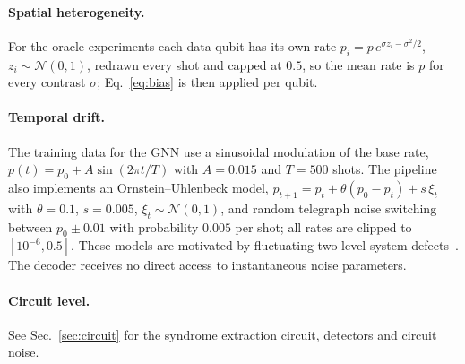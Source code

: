 \paragraph{Spatial heterogeneity.} For the oracle experiments each data
qubit has its own rate $p_i=p\,e^{\sigma z_i-\sigma^2/2}$,
$z_i\sim\mathcal N(0,1)$, redrawn every shot and capped at $0.5$, so the
mean rate is $p$ for every contrast $\sigma$; Eq.~\eqref{eq:bias} is then
applied per qubit.

\paragraph{Temporal drift.} The training data for the GNN use a
sinusoidal modulation of the base rate, $p(t)=p_0+A\sin(2\pi t/T)$ with
$A=0.015$ and $T=500$ shots. The pipeline also implements an
Ornstein--Uhlenbeck model, $p_{t+1}=p_t+\theta(p_0-p_t)+s\,\xi_t$ with
$\theta=0.1$, $s=0.005$, $\xi_t\sim\mathcal N(0,1)$, and random telegraph
noise switching between $p_0\pm0.01$ with probability $0.005$ per shot;
all rates are clipped to $[10^{-6},0.5]$. These models are motivated by
fluctuating two-level-system defects~\cite{Klimov2018,Carroll2022}. The
decoder receives no direct access to instantaneous noise parameters.

\paragraph{Circuit level.} See Sec.~\ref{sec:circuit} for the syndrome
extraction circuit, detectors and circuit noise.

